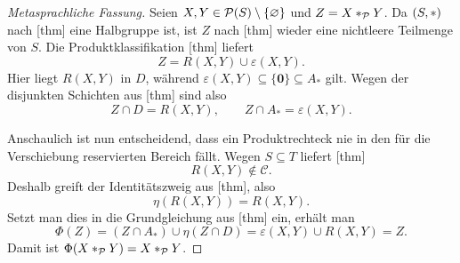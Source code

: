 \documentclass[main.tex]{subfiles}
\begin{document}
\begin{proof}[Metasprachliche Fassung]
Seien \(X,Y\in\mathcal{P}(S)\setminus\{\varnothing\}\) und \(Z=X\mathbin{\ast}_{\mathcal P}Y\). Da
\((S,\mathbin{\ast})\) nach
[thm] eine Halbgruppe ist,
ist \(Z\) nach [thm] wieder eine
nichtleere Teilmenge von \(S\). Die Produktklassifikation
[thm] liefert
\[
  Z=R(X,Y)\cup\varepsilon(X,Y).
\]
Hier liegt \(R(X,Y)\) in \(D\), während
\(\varepsilon(X,Y)\subseteq\{\mathbf0\}\subseteq A_*\) gilt. Wegen der
disjunkten Schichten aus
[thm] sind also
\[
  Z\cap D=R(X,Y),
  \qquad
  Z\cap A_*=\varepsilon(X,Y).
\]

Anschaulich ist nun entscheidend, dass ein Produktrechteck nie in den für
die Verschiebung reservierten Bereich fällt. Wegen \(S\subseteq T\) liefert
[thm]
\[
  R(X,Y)\notin\mathcal C.
\]
Deshalb greift der Identitätszweig aus
[thm], also
\[
  \eta(R(X,Y))=R(X,Y).
\]
Setzt man dies in die Grundgleichung aus
[thm] ein, erhält man
\[
  \Phi(Z)
  =(Z\cap A_*)\cup\eta(Z\cap D)
  =\varepsilon(X,Y)\cup R(X,Y)
  =Z.
\]
Damit ist
\(\Phi(X\mathbin{\ast}_{\mathcal P}Y)=X\mathbin{\ast}_{\mathcal P}Y\).
\end{proof}
\end{document}
